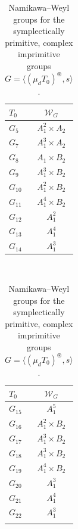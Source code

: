 \documentclass[a4paper]{amsart}
\theoremstyle{plain}
\theoremstyle{definition}
\theoremstyle{remark}
\begin{document}
\begin{table}
  \caption{Namikawa--Weyl groups for the symplectically primitive, complex imprimitive groups \(G = \langle (\mu_d T_0)^\circledast, s\rangle\).}
  \label{tab:primimprim}
  \begin{tabular}{|l|c|}
  \(T_0\)                & \(\mathcal W_G\) \\
  \hline
  \(G_5\)                & \(A_1^2 \times A_2\)\\
  \(G_7\)                & \(A_1^3 \times A_2\)  \\
  \(G_8\)                & \(A_1 \times B_2\)  \\
  \(G_9\)                & \(A_1^3 \times B_2\)  \\
  \(G_{10}\)             & \(A_1^2 \times B_2\)  \\
  \(G_{11}\)             & \(A_1^4 \times B_2\)  \\
  \(G_{12}\)             & \(A_1^2\)  \\
  \(G_{13}\)             & \(A_1^4\)  \\
  \(G_{14}\)             & \(A_1^3\)  \\
  \end{tabular}~
  \begin{tabular}{|l|c|}
  \(T_0\)                & \(\mathcal W_G\) \\
  \hline
  \(G_{15}\)             & \(A_1^5\)  \\
  \(G_{16}\)             & \(A_1^2 \times B_2\)  \\
  \(G_{17}\)             & \(A_1^3 \times B_2\)  \\
  \(G_{18}\)             & \(A_1^3 \times B_2\)  \\
  \(G_{19}\)             & \(A_1^4 \times B_2\)  \\
  \(G_{20}\)             & \(A_1^3\)  \\
  \(G_{21}\)             & \(A_1^4\)  \\
  \(G_{22}\)             & \(A_1^3\) \\
   &
  \end{tabular}
\end{table}
\end{document}

